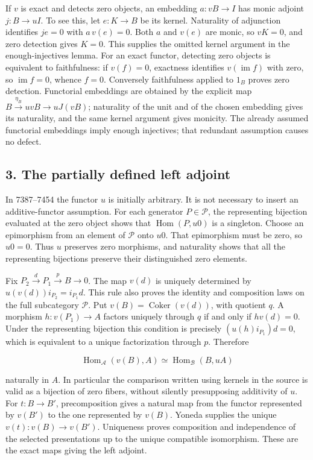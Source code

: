 If \(v\) is exact and detects zero objects, an embedding \(a:vB\to I\) has monic adjoint \(j:B\to uI\). To see this, let \(e:K\to B\) be its kernel. Naturality of adjunction identifies \(je=0\) with \(a\,v(e)=0\). Both \(a\) and \(v(e)\) are monic, so \(vK=0\), and zero detection gives \(K=0\). This supplies the omitted kernel argument in the enough-injectives lemma. For an exact functor, detecting zero objects is equivalent to faithfulness: if \(v(f)=0\), exactness identifies \(v(\operatorname{im}f)\) with zero, so \(\operatorname{im}f=0\), whence \(f=0\). Conversely faithfulness applied to \(1_B\) proves zero detection. Functorial embeddings are obtained by the explicit map \(B\xrightarrow{\eta_B}uvB\to uJ(vB)\); naturality of the unit and of the chosen embedding gives its naturality, and the same kernel argument gives monicity. The already assumed functorial embeddings imply enough injectives; that redundant assumption causes no defect.

\subsection{3. The partially defined left adjoint}\label{note-09-the-partially-defined-left-adjoint}

In 7387--7454 the functor \(u\) is initially arbitrary. It is not necessary to insert an additive-functor assumption. For each generator \(P\in\mathcal P\), the representing bijection evaluated at the zero object shows that \(\operatorname{Hom}(P,u0)\) is a singleton. Choose an epimorphism from an element of \(\mathcal P\) onto \(u0\). That epimorphism must be zero, so \(u0=0\). Thus \(u\) preserves zero morphisms, and naturality shows that all the representing bijections preserve their distinguished zero elements.

Fix \(P_2\xrightarrow d P_1\xrightarrow p B\to0\). The map \(v(d)\) is uniquely determined by \(u(v(d))i_{P_2}=i_{P_1}d\). This rule also proves the identity and composition laws on the full subcategory \(\mathcal P\). Put \(v(B)=\operatorname{Coker}(v(d))\), with quotient \(q\). A morphism \(h:v(P_1)\to A\) factors uniquely through \(q\) if and only if \(h v(d)=0\). Under the representing bijection this condition is precisely \((u(h)i_{P_1})d=0\), which is equivalent to a unique factorization through \(p\). Therefore

\[
\operatorname{Hom}_{\mathcal A}(v(B),A)
\simeq \operatorname{Hom}_{\mathcal B}(B,uA)
\]

naturally in \(A\). In particular the comparison written using kernels in the source is valid as a bijection of zero fibers, without silently presupposing additivity of \(u\). For \(t:B\to B'\), precomposition gives a natural map from the functor represented by \(v(B')\) to the one represented by \(v(B)\). Yoneda supplies the unique \(v(t):v(B)\to v(B')\). Uniqueness proves composition and independence of the selected presentations up to the unique compatible isomorphism. These are the exact maps giving the left adjoint.

